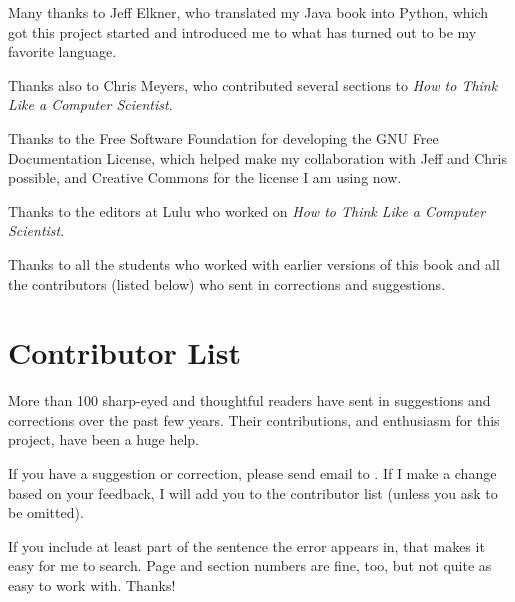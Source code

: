 Many thanks to Jeff Elkner, who translated my Java book into Python, which got
this project started and introduced me to what has turned out to be my favorite
language.
\bigskip

Thanks also to Chris Meyers, who contributed several sections to \emph{How to
Think Like a Computer Scientist}.
\bigskip

Thanks to the Free Software Foundation for developing the GNU Free Documentation
License, which helped make my collaboration with Jeff and Chris possible, and Creative
Commons for the license I am using now.
\bigskip

Thanks to the editors at Lulu who worked on \emph{How to Think Like a Computer
Scientist}.
\bigskip

Thanks to all the students who worked with earlier versions of this book and all
the contributors (listed below) who sent in corrections and suggestions.
\bigskip

\section{Contributor List}

More than 100 sharp-eyed and thoughtful readers have sent in suggestions and
corrections over the past few years. Their contributions, and enthusiasm for
this project, have been a huge help.

If you have a suggestion or correction, please send email to
. If I make a change based on your feedback, I
will add you to the contributor list (unless you ask to be omitted).

If you include at least part of the sentence the error appears in, that makes it
easy for me to search. Page and section numbers are fine, too, but not quite as
easy to work with. Thanks!

